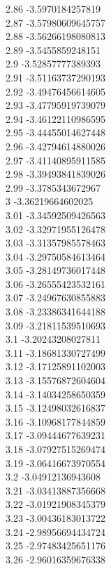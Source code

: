 {2.86	-3.5970184257819\\
2.87	-3.57980609645757\\
2.88	-3.56266198080813\\
2.89	-3.5455859248151\\
2.9	-3.52857777389393\\
2.91	-3.51163737290193\\
2.92	-3.49476456614605\\
2.93	-3.47795919739079\\
2.94	-3.46122110986595\\
2.95	-3.44455014627448\\
2.96	-3.42794614880026\\
2.97	-3.41140895911585\\
2.98	-3.39493841839026\\
2.99	-3.3785343672967\\
3	-3.36219664602025\\
3.01	-3.34592509426563\\
3.02	-3.32971955126478\\
3.03	-3.31357985578463\\
3.04	-3.29750584613464\\
3.05	-3.28149736017448\\
3.06	-3.26555423532161\\
3.07	-3.24967630855883\\
3.08	-3.23386341644188\\
3.09	-3.21811539510693\\
3.1	-3.20243208027811\\
3.11	-3.18681330727499\\
3.12	-3.17125891102003\\
3.13	-3.15576872604604\\
3.14	-3.14034258650359\\
3.15	-3.12498032616837\\
3.16	-3.10968177844859\\
3.17	-3.09444677639231\\
3.18	-3.07927515269474\\
3.19	-3.06416673970554\\
3.2	-3.04912136943608\\
3.21	-3.03413887356668\\
3.22	-3.01921908345379\\
3.23	-3.00436183013722\\
3.24	-2.98956694434724\\
3.25	-2.97483425651176\\
3.26	-2.96016359676338\\
}
